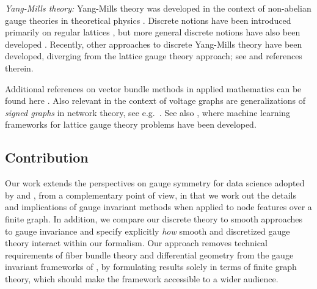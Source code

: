 \documentclass[10pt,reqno]{amsart}
\numberwithin{equation}{section}
\theoremstyle{bfnote}
\theoremstyle{bfdef}
\begin{document}
	\textit{Yang-Mills theory:}
	Yang-Mills theory was developed in the context of non-abelian gauge theories in theoretical physics \cite{peskinIntroductionQuantumField1995a,baumEichfeldtheorieEinfuehrungDifferentialgeometrie2014,hamiltonMathematicalGaugeTheory2017}. Discrete notions have been introduced primarily on regular lattices \cite{Gattringer:2010zz}, but more general discrete notions have also been developed \cite{jiangGaugeTheoryGraphs2023}. Recently, other approaches to discrete Yang-Mills theory have been developed, diverging from the lattice gauge theory approach; see \cite{sushch2DDiscreteYang2024} and references therein. 

		Additional references on vector bundle methods in applied mathematics can be found here \cite{batardCliffordBundlesCommon2010,ohsawaSymmetryReductionOptimal2013,batardCovariantDerivativesTheir2014,budninskiyParallelTransportUnfolding2019,huroyanSolvingJigsawPuzzles2020}. Also relevant in the context of voltage graphs are generalizations of \textit{signed graphs} in network theory, see e.g.~\cite{Zaslavsky:1982aa,cloningerRandomWalksConductance2024,tianMatrixweightedNetworksModeling2024,tianStructuralBalanceRandom2024,evansSignedNetworksGroup2025}. See also \cite{favoniLatticeGaugeEquivariant2022,aronssonHomogeneousVectorBundles2022,aronssonGeometricalAspectsLattice2023a}, where machine learning frameworks for lattice gauge theory problems have been developed.

\subsection{Contribution}
	Our work extends the perspectives on gauge symmetry for data science adopted by \cite{weilerCoordinateIndependentConvolutional2021} and \cite{gerkenGeometricDeepLearning2021}, from a complementary point of view, in that we work out the details and implications of gauge invariant methods when applied to node features over a finite graph.
	In addition, we compare our discrete theory to smooth approaches to gauge invariance and specify explicitly \textit{how} smooth and discretized gauge theory interact within our formalism.
	Our approach removes technical requirements of fiber bundle theory and differential geometry from the gauge invariant frameworks of \cite{weilerCoordinateIndependentConvolutional2021,gerkenGeometricDeepLearning2021,batardHeatEquationsVector2011,batardClassGeneralizedLaplacians2014,gaoGeometrySynchronizationProblems2019}, by formulating results solely in terms of finite graph theory, which should make the framework accessible to a wider audience.
\end{document}
